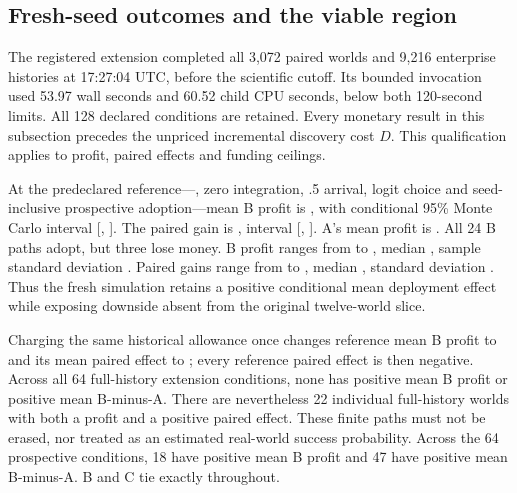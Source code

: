 \subsection{Fresh-seed outcomes and the viable region}
The registered extension completed all 3,072 paired worlds and 9,216 enterprise histories at
17:27:04 UTC, before the scientific cutoff. Its bounded invocation used 53.97 wall seconds and
60.52 child CPU seconds, below both 120-second limits. All 128 declared conditions are retained.
Every monetary result in this subsection precedes the unpriced incremental discovery cost \(D\).
This qualification applies to profit, paired effects and funding ceilings.

At the predeclared reference---, zero integration, .5 arrival, logit choice and
seed-inclusive prospective adoption---mean B profit is , with conditional
95\% Monte Carlo interval [, ]. The paired gain is ,
interval [, ]. A's mean profit is . All 24 B paths
adopt, but three lose money. B profit ranges from  to ,
median , sample standard deviation . Paired gains range from
 to , median , standard deviation .
Thus the fresh simulation retains a positive conditional mean deployment effect while exposing
downside absent from the original twelve-world slice.

Charging the same  historical allowance once changes reference mean B profit to
 and its mean paired effect to ; every reference paired effect
is then negative. Across all 64 full-history extension conditions, none has positive mean
B profit or positive mean B-minus-A. There are nevertheless 22 individual full-history worlds
with both a profit and a positive paired effect. These finite paths must not be erased, nor
treated as an estimated real-world success probability. Across the 64 prospective conditions,
18 have positive mean B profit and 47 have positive mean B-minus-A. B and C tie exactly throughout.

